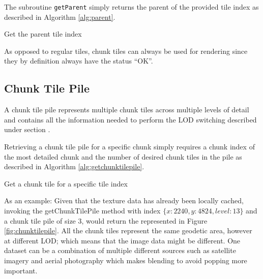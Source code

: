The subroutine \texttt{getParent} simply returns the parent of the provided tile index as described in Algorithm \ref{alg:parent}.

\begin{algorithm}[htp]
 \caption{Get the parent tile index}
  \label{alg:parent}
\end{algorithm}
\fi

As opposed to regular tiles, chunk tiles can always be used for rendering since they by definition always have the status ``OK''.



\subsection{Chunk Tile Pile}
\label{section:chunktilepile}

A chunk tile pile represents multiple chunk tiles across multiple levels of detail and contains all the information needed to perform the LOD switching described under section .


Retrieving a chunk tile pile for a specific chunk simply requires a chunk index of the most detailed chunk and the number of desired chunk tiles in the pile as described in Algorithm \ref{alg:getchunktilepile}.

\begin{algorithm}[htp]
 \caption{Get a chunk tile for a specific tile index}
  \label{alg:getchunktilepile}
\end{algorithm}

As an example: 
Given that the texture data has already been locally cached, invoking the getChunkTilePile method with index $\{x: 2240, y: 4824, level: 13 \}$ and a chunk tile pile of size 3, would return the  represented in Figure \ref{fig:chunktilepile}. All the chunk tiles represent the same geodetic area, however at different LOD; which means that the image data might be different. One dataset can be a combination of multiple different sources such as satellite imagery and aerial photography which makes blending to avoid popping more important.

